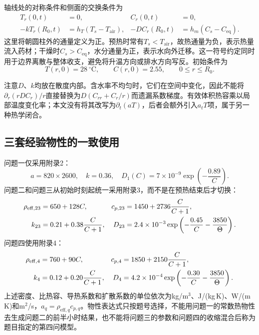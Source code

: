 轴线处的对称条件和侧面的交换条件为
\begin{align}
 T_r(0,t)&=0, & C_r(0,t)&=0,\label{eq:center}\\
 -kT_r(R_0,t)&=h_T(T_s-T_{\mathrm{air}}), &
 -DC_r(R_0,t)&=h_m(C_s-C_{\mathrm{eq}}).
 \label{eq:robin}
\end{align}
这里将朝圆柱外的通量定义为正。预热时常有$T_s<T_{\mathrm{air}}$，故热通量为负，表示热量流入药材；干燥时$C_s>C_{\mathrm{eq}}$，水分通量为正，表示水向外迁移。这一符号约定同时用于边界离散与整体收支，避免将升温方向或排水方向写反。初始条件为
\begin{equation}
 T(r,0)=28\ ^\circ\mathrm C,\qquad C(r,0)=2.55,
 \qquad 0\le r\le R_0.\label{eq:initial}
\end{equation}

注意$D$、$k$均放在散度内部。含水率不均匀时，它们在空间中变化，因此不能将$\partial_r(rD C_r)/r$直接替换为$D(C_{rr}+C_r/r)$而遗漏系数梯度。有效体积热容乘以局部温度变化率；本文没有将其改写为$\partial_t(aT)$，后者会额外引入$a_tT$项，属于另一种热学闭合。

\subsection{三套经验物性的一致使用}
问题一仅采用附录2：
\begin{equation}
 a=820\times2600,\quad k=0.36,\quad
 D_1(C)=7\times10^{-9}\exp\left(-\frac{0.89}{C}\right).
 \label{eq:prop1}
\end{equation}
问题二和问题三从初始时刻起统一采用附录3，而不是在预热结束后才切换：
\begin{align}
 \rho_{\mathrm{eff},23}&=650+128C,&
 c_{p,23}&=1450+2736\frac{C}{C+1},\notag\\
 k_{23}&=0.21+0.38\frac{C}{C+1},&
 D_{23}&=2.4\times10^{-3}
 \exp\left(-\frac{0.45}{C}-\frac{3850}{\Theta}\right).
 \label{eq:prop23}
\end{align}
问题四使用附录4：
\begin{align}
 \rho_{\mathrm{eff},4}&=760+90C,&
 c_{p,4}&=1850+2150\frac{C}{C+1},\notag\\
 k_4&=0.12+0.20\frac{C}{C+1},&
 D_4&=4.2\times10^{-4}
 \exp\left(-\frac{0.30}{C}-\frac{3850}{\Theta}\right).
 \label{eq:prop4}
\end{align}
上述密度、比热容、导热系数和扩散系数的单位依次为kg/m$^3$、J/(kg\,K)、W/(m\,K)和m$^2$/s，$a_q=\rho_{\mathrm{eff},q}c_{p,q}$。物性表达式只按题号选择，不能用问题一的常数热物性去生成问题二的前半小时结果，也不能将问题三的参数和问题四的收缩混合后称为题目指定的第四问模型。

